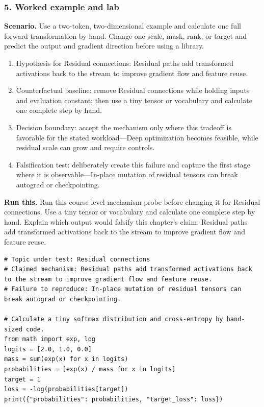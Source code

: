 \subsubsection*{5. Worked example and lab}
\textbf{Scenario.} Use a two-token, two-dimensional example and calculate one full forward transformation by hand. Change one scale, mask, rank, or target and predict the output and gradient direction before using a library.
\begin{enumerate}
\item Hypothesis for Residual connections: Residual paths add transformed activations back to the stream to improve gradient flow and feature reuse.
\item Counterfactual baseline: remove Residual connections while holding inputs and evaluation constant; then use a tiny tensor or vocabulary and calculate one complete step by hand.
\item Decision boundary: accept the mechanism only where this tradeoff is favorable for the stated workload—Deep optimization becomes feasible, while residual scale can grow and require controls.
\item Falsification test: deliberately create this failure and capture the first stage where it is observable—In-place mutation of residual tensors can break autograd or checkpointing.
\end{enumerate}
\textbf{Run this.} Run this course-level mechanism probe before changing it for Residual connections. Use a tiny tensor or vocabulary and calculate one complete step by hand. Explain which output would falsify this chapter's claim: Residual paths add transformed activations back to the stream to improve gradient flow and feature reuse.
\begin{Verbatim}[fontsize=\scriptsize]
# Topic under test: Residual connections
# Claimed mechanism: Residual paths add transformed activations back to the stream to improve gradient flow and feature reuse.
# Failure to reproduce: In-place mutation of residual tensors can break autograd or checkpointing.

# Calculate a tiny softmax distribution and cross-entropy by hand-sized code.
from math import exp, log
logits = [2.0, 1.0, 0.0]
mass = sum(exp(x) for x in logits)
probabilities = [exp(x) / mass for x in logits]
target = 1
loss = -log(probabilities[target])
print({"probabilities": probabilities, "target_loss": loss})
\end{Verbatim}
